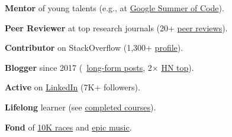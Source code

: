 \documentclass{files/CV/cesar}
\begin{document}
\textbf{Mentor} of young talents (e.g., at \href{https://summerofcode.withgoogle.com/archive/2021/projects/6679675211874304}{Google Summer of Code}).

\textbf{Peer Reviewer} at top research journals (20+ \href{https://www.cesarsotovalero.net/service#academic-reviewer}{peer reviews}).

\textbf{Contributor} on StackOverflow (1,300+ \href{https://stackoverflow.com/users/10480869/cesarsotovalero}{profile}).

\textbf{Blogger} since 2017 (\blogposts~\href{https://www.cesarsotovalero.net/blog}{long-form posts}, 2$\times$ \href{https://news.ycombinator.com/favorites?id=cesarsotovalero}{HN top}).

\textbf{Active} on \href{https://www.cesarsotovalero.net/linkedin}{LinkedIn} (7K+ followers).

\textbf{Lifelong} learner (see \href{https://www.cesarsotovalero.net/courses.html}{completed courses}).

\textbf{Fond} of \href{https://www.cesarsotovalero.net/races.html}{10K races} and \href{https://open.spotify.com/playlist/1E4xBA3IYuTjtTphOV16FM}{epic music}.
\end{document}
